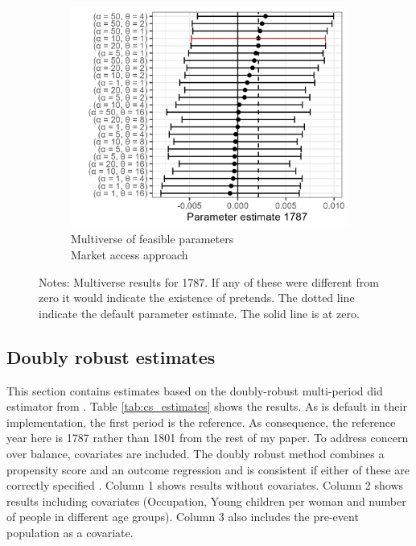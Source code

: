 \begin{figure}[H]
\begin{subfigure}[b]{0.45\textwidth}
    \end{subfigure}
    \vspace{0.45cm}
    \begin{subfigure}[b]{0.45\textwidth}
        \centering
        \caption{\label{fig:mult3} Multiverse of feasible parameters\\Market access approach}
        \includegraphics[width=\textwidth]{Plots/Regression_plots/Multiverse_MA_param_1787.png}
    \end{subfigure}
    \caption*{Notes: Multiverse results for 1787. If any of these were different from zero it would indicate the existence of pretends. The dotted line indicate the default parameter estimate. The solid line is at zero.}
    \label{fig:pop2}
\end{figure}

\FloatBarrier
\subsection{Doubly robust estimates}
This section contains estimates based on the doubly-robust multi-period did estimator from \cite{Callaway2021did}. Table \ref{tab:cs_estimates} shows the results. As is default in their implementation, the first period is the reference. As consequence, the reference year here is 1787 rather than 1801 from the rest of my paper. To address concern over balance, covariates are included. The doubly robust method combines a propensity score and an outcome regression and is consistent if either of these are correctly specified \citep{Santanna2020DRDID}. Column 1 shows results without covariates. Column 2 shows results including covariates (Occupation, Young children per woman and number of people in different age groups). Column 3 also includes the pre-event population as a covariate. 



